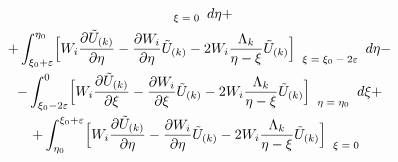 \begin{multline}
_{\scriptsize{

\begin{array}{l}

\xi=0

 \end{array} }}

  d \eta +\\

+ \int _{\xi_0+ \varepsilon}^{\eta_0}

\Bigl[

W_i \frac{\partial \tilde{U}_{(k)}}{\partial \eta} - \frac{\partial W_i}{\partial \eta} \tilde{U}_{(k)} - 2 W_i \frac{\Lambda_k}{\eta-\xi} \tilde{U}_{(k)}

\Bigr]

_{\scriptsize{

\begin{array}{l}

\xi=\xi_0-2 \varepsilon

 \end{array} }}

  d \eta -

  \\

- \int _{\xi_0- 2\varepsilon}^{0}

\Bigl[

W_i \frac{\partial \tilde{U}_{(k)}}{\partial \xi} - \frac{\partial W_i}{\partial \xi} \tilde{U}_{(k)} - 2 W_i \frac{\Lambda_k}{\eta-\xi} \tilde{U}_{(k)}

\Bigr]

_{\scriptsize{

\begin{array}{l}

\eta=\eta_0

 \end{array} }}

  d \xi +\\

+ \int _{\eta_0}^{\xi_0+\varepsilon}

\Bigl[

W_i \frac{\partial \tilde{U}_{(k)}}{\partial \eta} - \frac{\partial W_i}{\partial \eta} \tilde{U}_{(k)} - 2 W_i \frac{\Lambda_k}{\eta-\xi} \tilde{U}_{(k)}

\Bigr]

_{\scriptsize{

\begin{array}{l}

\xi=0

 \end{array} }}


\end{multline}
